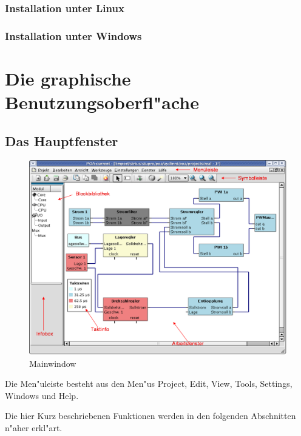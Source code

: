 \documentclass[a4paper,titlepage,12pt,ngerman]{scrbook}
\begin{document}
\subsection{Installation unter Linux}
	
\subsection{Installation unter Windows}


	
\chapter{Die graphische Benutzungsoberfl"ache}

\section{Das Hauptfenster}
\begin{figure}[htbp]

\begin{center}

\includegraphics[width=15cm]{Mainwindow1}

\caption{Mainwindow}\label{test}

\end{center}

\end{figure}

Die Men"uleiste besteht aus den Men"us Project, Edit, View, Tools, Settings, Windows und Help.\par
\newpage
Die hier Kurz beschriebenen Funktionen werden in den folgenden Abschnitten n"aher erkl"art.\par
\end{document}
